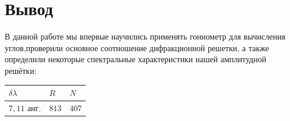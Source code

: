 \documentclass[a4paper]{article}
\begin{document}
\section{Вывод}
В данной работе мы впервые научились применять гониометр для вычисления углов,проверили основное соотношение дифракционной решетки, а также определили некоторые спектральные характеристики нашей амплитудной решётки:\\
\normalsize
\begin{center}
\begin{tabular}{|l|l|l|}
\hline
 $\delta \lambda$ & $R$ & $N$\\
\hline
$7,11$ анг. & $813$ & $407$\\
\hline
\end{tabular}
\end{center}
\end{document}
